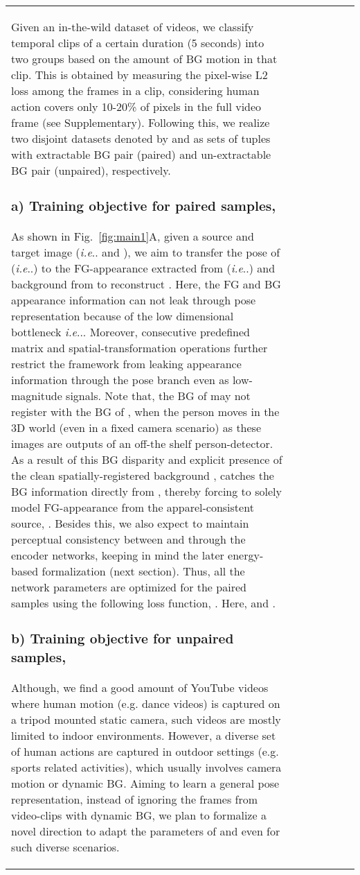 \documentclass[letterpaper]{article} \usepackage{aaai20}  \usepackage{times}  \usepackage{helvet}  \usepackage{courier}  \usepackage{url}  \usepackage{graphicx}  \usepackage{amsmath}
\makeatletter
\DeclareRobustCommand\onedot{\futurelet\@let@token\@onedot}
\def\@onedot{\ifx\@let@token.\else.\null\fi\xspace}
\def\ie{\emph{i.e}\onedot} \def\Ie{\emph{I.e}\onedot}
\makeatother
\begin{document}
\begin{table}[t]
{\begin{tabular}{l|ccc|cc|c}
{{Given an in-the-wild dataset of videos, we classify temporal clips of a certain duration (5 seconds) into two groups based on the amount of BG motion in that clip. This is obtained by measuring the pixel-wise L2 loss among the frames in a clip, considering human action covers only 10-20\% of pixels in the full video frame (see Supplementary). Following this, we realize two disjoint datasets denoted by  and  as sets of tuples with extractable BG pair (paired) and un-extractable BG pair (unpaired), respectively.


\subsubsection{a) Training objective for paired samples, } As shown in Fig.~\ref{fig:main1}A, given a source and target image (\ie  and ), we aim to transfer the pose of  (\ie ) to the FG-appearance extracted from  (\ie ) and background from  to reconstruct .  Here, the FG and BG appearance information can not leak through pose representation because of the low dimensional bottleneck \ie . Moreover, consecutive predefined matrix  and  spatial-transformation  operations  further restrict the framework from leaking appearance information through the pose branch even as low-magnitude signals. Note that, the BG of  may not register with the BG of , when the person moves in the 3D world (even in a fixed camera scenario) as these images are outputs of an off-the shelf person-detector. As a result of this BG disparity and explicit presence of the clean spatially-registered background ,  catches the BG information directly from , thereby forcing  to solely model FG-appearance from the apparel-consistent source, . Besides this, we also expect to maintain perceptual consistency between  and  through the encoder networks, keeping in mind the later energy-based formalization (next section). Thus, all the network parameters are optimized for the paired samples using the following loss function, . Here,  and .

\subsubsection{b) Training objective for unpaired samples, } Although, we find a good amount of YouTube videos where human motion (e.g. dance videos) is captured on a tripod mounted static camera, such videos are mostly limited to indoor environments. However, a diverse set of human actions are captured in outdoor settings (e.g. sports related activities), which usually involves camera motion or dynamic BG. Aiming to learn a general pose representation, instead of ignoring the frames from video-clips with dynamic BG, we plan to formalize a novel direction to adapt the parameters of  and  even for such diverse scenarios.

}}
\end{tabular}}
\end{table}
\end{document}
